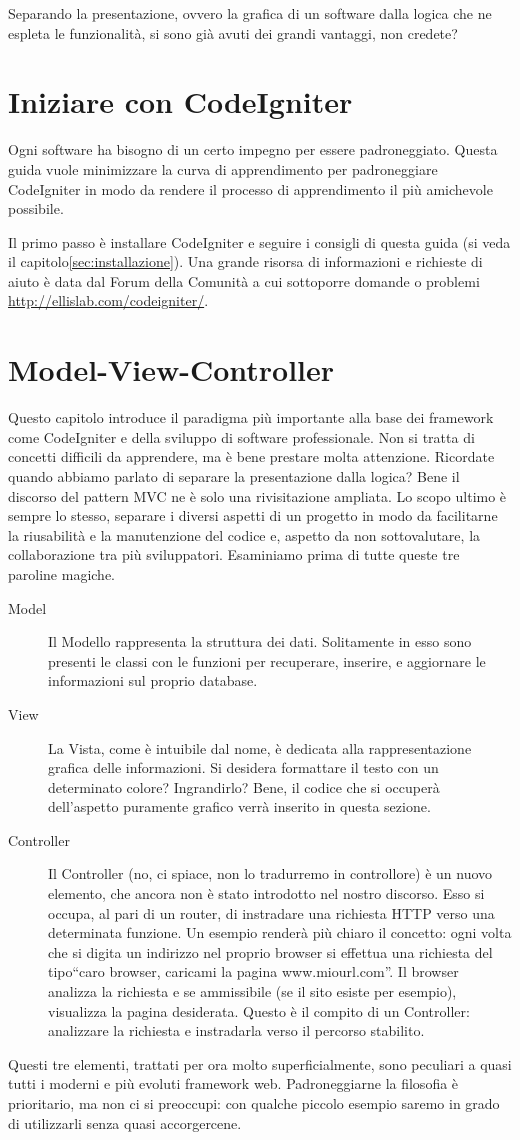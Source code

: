 Separando la presentazione, ovvero la grafica di un software dalla logica che ne espleta le funzionalità, si sono già avuti dei grandi vantaggi, non credete?
\label{sec:config}

\section{Iniziare con CodeIgniter}
Ogni software ha bisogno di un certo impegno per essere padroneggiato. Questa guida vuole minimizzare la curva di apprendimento per padroneggiare CodeIgniter in modo da rendere il processo di apprendimento il più amichevole possibile.

Il primo passo è installare CodeIgniter e seguire i consigli di questa guida (si veda il capitolo\vref{sec:installazione}). Una grande risorsa di informazioni e richieste di aiuto è data dal Forum della Comunità a cui sottoporre domande o problemi \url{http://ellislab.com/codeigniter/}.

\section{Model-View-Controller}
Questo capitolo introduce il paradigma più importante alla base dei framework come CodeIgniter e della sviluppo di software professionale. Non si tratta di concetti difficili da apprendere, ma è bene prestare molta attenzione. Ricordate quando abbiamo parlato di separare la presentazione dalla logica? Bene il discorso del pattern \ac{MVC} ne è solo una rivisitazione ampliata. Lo scopo ultimo è sempre lo stesso, separare i diversi aspetti di un progetto in modo da facilitarne la riusabilità e la manutenzione del codice e, aspetto da non sottovalutare, la collaborazione tra più sviluppatori. Esaminiamo prima di tutte queste tre paroline magiche.

\begin{description}
\item [Model] Il Modello rappresenta la struttura dei dati. Solitamente in esso sono presenti le classi con le funzioni per recuperare, inserire, e aggiornare le informazioni sul proprio database.
\item [View] La Vista, come è intuibile dal nome, è dedicata alla rappresentazione grafica delle informazioni. Si desidera formattare il testo con un determinato colore? Ingrandirlo? Bene, il codice che si occuperà dell'aspetto puramente grafico verrà inserito in questa sezione.
\item [Controller] Il Controller (no, ci spiace, non lo tradurremo in controllore) è un nuovo elemento, che ancora non è stato introdotto nel nostro discorso. Esso si occupa, al pari di un router, di instradare una richiesta \ac{HTTP} verso una determinata funzione. Un esempio renderà più chiaro il concetto: ogni volta che si digita un indirizzo nel proprio browser si effettua una richiesta del tipo``caro browser, caricami la pagina www.miourl.com''. Il browser analizza la richiesta e se ammissibile (se il sito esiste per esempio), visualizza la pagina desiderata. Questo è il compito di un Controller: analizzare la richiesta e instradarla verso il percorso stabilito. 
\end{description}

Questi tre elementi, trattati per ora molto superficialmente, sono peculiari a quasi tutti i moderni e più evoluti framework web. Padroneggiarne la filosofia è prioritario, ma non ci si preoccupi: con qualche piccolo esempio saremo in grado di utilizzarli senza quasi accorgercene.